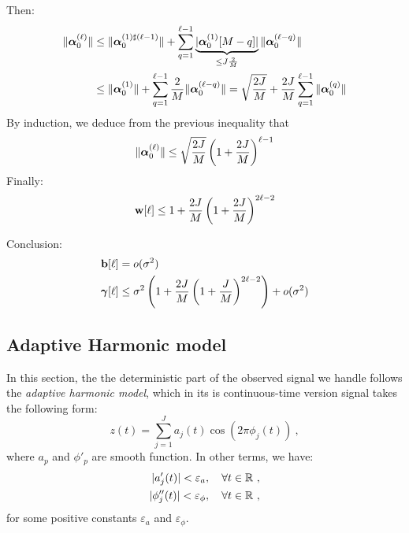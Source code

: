 Then:
\begin{align*}
\|\boldsymbol{\alpha}_0^{(\ell)}\| &\leq \|\boldsymbol{\alpha}_0^{(1)\sharp(\ell -1)}\| + \sum_{q=1}^{\ell-1}\underbrace{|\boldsymbol{\alpha}_0^{(1)}[M-q]|}_{\leq J\frac2M}\|\boldsymbol{\alpha}_0^{(\ell-q)}\| \\
&\leq \|\boldsymbol{\alpha}_0^{(1)}\| + \sum_{q=1}^{\ell-1}\dfrac2M\|\boldsymbol{\alpha}_0^{(\ell-q)}\| = \sqrt{\dfrac{2J}M} + \dfrac{2J}M\sum_{q=1}^{\ell-1}\|\boldsymbol{\alpha}_0^{(q)}\|
\end{align*}
By induction, we deduce from the previous inequality that
\[
\|\boldsymbol{\alpha}_0^{(\ell)}\| \leq \sqrt{\dfrac{2J}M} \left( 1+ \dfrac{2J}M \right)^{\ell-1}
\]
Finally:
\[
{\mathbf w}[\ell] \leq 1 + \dfrac{2J}{M}\left( 1 + \dfrac{2J}{M}\right)^{2\ell-2}
\]

Conclusion:
\begin{align*}
{\mathbf b}[\ell] &= o(\sigma^2) \\
\boldsymbol{\gamma}[\ell] &\leq \sigma^2\left(1 + \dfrac{2J}{M}\left( 1 + \dfrac{J}{M}\right)^{2\ell-2}\right)+ o(\sigma^2)
\end{align*}

\subsection{Adaptive Harmonic model}
In this section, the the deterministic part of the observed signal we handle follows the \textit{adaptive harmonic model}, which in its is continuous-time version signal takes the following form:
\begin{equation}
z(t) = \sum_{j=1}^J a_j(t)\cos(2\pi\phi_j(t))\ ,
\end{equation}
where $a_p$ and $\phi'_p$ are smooth function. In other terms, we have:
\begin{align}
|a'_j(t)|<\varepsilon_a,\quad\forall t\in{\mathbb R}\ ,\\
|\phi''_j(t)|<\varepsilon_\phi,\quad\forall t\in{\mathbb R}\ ,
\end{align}
for some positive constants $\varepsilon_a$ and $\varepsilon_\phi$.
